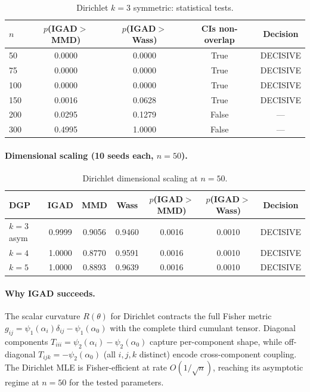 \documentclass[12pt]{article}
\begin{document}
\begin{table}[h]
\centering
\caption{Dirichlet $k=3$ symmetric: statistical tests.}
\begin{tabular}{lcccc}
\toprule
$n$ & $p$(IGAD$>$MMD) & $p$(IGAD$>$Wass) & CIs non-overlap & Decision \\
\midrule
50  & 0.0000 & 0.0000 & True  & DECISIVE \\
75  & 0.0000 & 0.0000 & True  & DECISIVE \\
100 & 0.0000 & 0.0000 & True  & DECISIVE \\
150 & 0.0016 & 0.0628 & True  & DECISIVE \\
200 & 0.0295 & 0.1279 & False & --- \\
300 & 0.4995 & 1.0000 & False & --- \\
\bottomrule
\end{tabular}
\end{table}

\paragraph{Dimensional scaling (10 seeds each, $n=50$).}

\begin{table}[h]
\centering
\caption{Dirichlet dimensional scaling at $n=50$.}
\begin{tabular}{lcccccc}
\toprule
DGP & IGAD & MMD & Wass & $p$(IGAD$>$MMD) & $p$(IGAD$>$Wass) & Decision \\
\midrule
$k=3$ asym & 0.9999 & 0.9056 & 0.9460 & 0.0016 & 0.0010 & DECISIVE \\
$k=4$      & 1.0000 & 0.8770 & 0.9591 & 0.0016 & 0.0010 & DECISIVE \\
$k=5$      & 1.0000 & 0.8893 & 0.9639 & 0.0016 & 0.0010 & DECISIVE \\
\bottomrule
\end{tabular}
\end{table}

\paragraph{Why IGAD succeeds.}
The scalar curvature $R(\theta)$ for Dirichlet contracts the full Fisher metric
$g_{ij} = \psi_1(\alpha_i)\delta_{ij} - \psi_1(\alpha_0)$ with the complete
third cumulant tensor. Diagonal components $T_{iii} = \psi_2(\alpha_i) -
\psi_2(\alpha_0)$ capture per-component shape, while off-diagonal
$T_{ijk} = -\psi_2(\alpha_0)$ (all $i,j,k$ distinct) encode cross-component
coupling. The Dirichlet MLE is Fisher-efficient at rate $O(1/\sqrt{n})$,
reaching its asymptotic regime at $n=50$ for the tested parameters.
\end{document}
